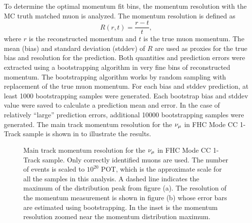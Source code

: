 To determine the optimal momentum fit bins, the momentum resolution
with the MC truth matched muon is analyzed. The momentum resolution
is defined as
\[
R(r,t)=\frac{r-t}{t},
\]
where $r$ is the reconstructed momentum and $t$ is the true muon
momentum. The mean (bias) and standard deviation (stddev) of $R$
are used as proxies for the true bias and resolution for the prediction.
Both quantities and prediction errors were extracted using a bootstrapping
algorithm\cite{springer_series978-0-387-84858-7} in very fine bins
of reconstructed momentum. The bootstrapping algorithm works by random
sampling with replacement of the true muon momentum. For each bias
and stddev prediction, at least 1000 bootstrapping samples were generated.
Each bootstrap bias and stddev value were saved to calculate a prediction
mean and error. In the case of relatively ``large'' prediction errors,
additional 10000 bootstrapping samples were generated. The main track
momentum resolution for the $\numu$ in FHC Mode CC 1-Track sample
is shown in 
to illustrate the results.

\begin{figure}
\begin{centering}
\par\end{centering}
\caption[Main Track Momentum Resolution for the $\numu$ in FHC Mode CC 1-Track
Sample]{Main track momentum resolution for the $\protect\nu_{\mu}$ in FHC Mode
CC 1-Track sample. Only correctly identified muons are used. The number
of events is scaled to $10^{20}$ POT, which is the approximate scale
for all the samples in this analysis. A dashed line indicates the
maximum of the distribution peak from figure (a). The resolution of
the momentum measurement is shown in figure (b) whose error bars are
estimated using bootstrapping. In the inset is the momentum resolution
zoomed near the momentum distribution maximum.\label{fig:MomentumKinematicsBootstrappingNumuCC1Track}}
\end{figure}

